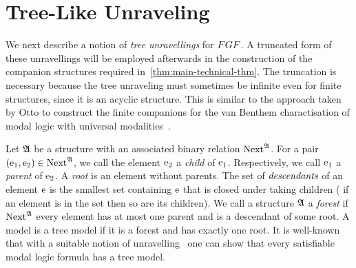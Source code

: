
\section{Tree-Like Unraveling}\label{sec:unraveling}
We next describe a notion of \emph{tree unravellings} for $\FGF$.
A truncated form of these unravellings will be employed afterwards in the construction of the companion structures required in~\cref{thm:main-technical-thm}.
The truncation is necessary because the tree unraveling must sometimes be infinite even for finite structures, since it is an acyclic structure.
This is similar to the approach taken by Otto to construct the finite companions for the van Benthem charactisation of modal logic with universal modalities~\cite[Proof of Lemma 38]{Otto04}.

Let ${\mathfrak{A}}$ be a structure with an associated binary relation $\mathrm{Next}^{{\mathfrak{A}}}$.
For a pair $(\mathrm{e}_1, \mathrm{e}_2) \in \mathrm{Next}^{{\mathfrak{A}}}$, we call the element $\mathrm{e}_2$ a \emph{child} of $\mathrm{e}_1$. Respectively, we call $\mathrm{e}_1$ a \emph{parent} of $\mathrm{e}_2$.
A \emph{root} is an element without parents.
The set of $\emph{descendants}$ of an element $\mathrm{e}$ is the smallest set containing $\mathrm{e}$ that is closed under taking children (\ie{} if an element is in the set then so are its children).
We call a structure ${\mathfrak{A}}$ a \emph{forest} if $\mathrm{Next}^{{\mathfrak{A}}}$ every element has at most one parent and is a descendant of some root.
A model is a tree model if it is a forest and has exactly one root.
It is well-known that with a suitable notion of unravelling~\cite[Prop. 3]{Rosen97} one can show that every satisfiable modal logic formula has a tree model.

